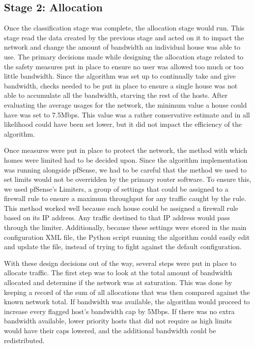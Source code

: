 \subsection{Stage 2: Allocation}
Once the classification stage was complete, the allocation stage would run.
This stage read the data created by the previous stage and acted on it to impact the network and change the amount of bandwidth an individual house was able to use.
The primary decisions made while designing the allocation stage related to the safety measures put in place to ensure no user was allowed too much or too little bandwidth.
Since the algorithm was set up to continually take and give bandwidth, checks needed to be put in place to ensure a single house was not able to accumulate all the bandwidth, starving the rest of the hosts.
After evaluating the average usages for the network, the minimum value a house could have was set to 7.5Mbps.
This value was a rather conservative estimate and in all likelihood could have been set lower, but it did not impact the efficiency of the algorithm.\par
Once measures were put in place to protect the network, the method with which homes were limited had to be decided upon.
Since the algorithm implementation was running alongside pfSense, we had to be careful that the method we used to set limits would not be overridden by the primary router software.
To ensure this, we used pfSense's Limiters, a group of settings that could be assigned to a firewall rule to ensure a maximum throughput for any traffic caught by the rule.
This method worked well because each house could be assigned a firewall rule based on its IP address.
Any traffic destined to that IP address would pass through the limiter.
Additionally, because these settings were stored in the main configuration XML file, the Python script running the algorithm could easily edit and update the file, instead of trying to fight against the default configuration.\par
With these design decisions out of the way, several steps were put in place to allocate traffic.
The first step was to look at the total amount of bandwidth allocated and determine if the network was at saturation.
This was done by keeping a record of the sum of all allocations that was then compared against the known network total.
If bandwidth was available, the algorithm would proceed to increase every flagged host's bandwidth cap by 5Mbps.
If there was no extra bandwidth available, lower priority hosts that did not require as high limits would have their caps lowered, and the additional bandwidth could be redistributed.
